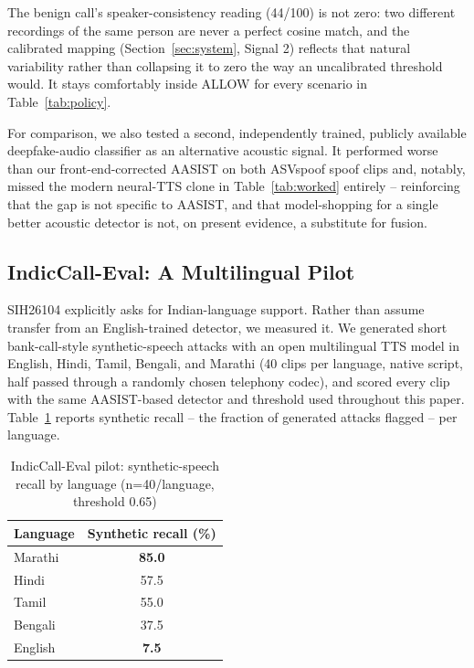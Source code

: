 \documentclass[conference]{IEEEtran}
\begin{document}
The benign call's speaker-consistency reading (44/100) is not zero: two
different recordings of the same person are never a perfect cosine match,
and the calibrated mapping (Section~\ref{sec:system}, Signal 2) reflects
that natural variability rather than collapsing it to zero the way an
uncalibrated threshold would. It stays comfortably inside ALLOW for every
scenario in Table~\ref{tab:policy}.

For comparison, we also tested a second, independently trained,
publicly available deepfake-audio classifier as an alternative acoustic
signal. It performed worse than our front-end-corrected AASIST on both
ASVspoof spoof clips and, notably, missed the modern neural-TTS clone in
Table~\ref{tab:worked} entirely -- reinforcing that the gap is not
specific to AASIST, and that model-shopping for a single better acoustic
detector is not, on present evidence, a substitute for fusion.

\subsection{IndicCall-Eval: A Multilingual Pilot}
\label{sec:indic}
SIH26104 explicitly asks for Indian-language support. Rather than assume
transfer from an English-trained detector, we measured it. We generated
short bank-call-style synthetic-speech attacks with an open multilingual
TTS model \cite{mms} in English, Hindi, Tamil, Bengali, and Marathi (40
clips per language, native script, half passed through a randomly
chosen telephony codec), and scored every clip with the same
AASIST-based detector and threshold used throughout this paper.
Table~\ref{tab:indic} reports synthetic recall -- the fraction of
generated attacks flagged -- per language.

\begin{table}[t]
\centering
\caption{IndicCall-Eval pilot: synthetic-speech recall by language (n=40/language, threshold 0.65)}
\label{tab:indic}
\begin{tabular}{@{}lc@{}}
\toprule
Language & Synthetic recall (\%) \\
\midrule
Marathi  & \textbf{85.0} \\
Hindi    & 57.5 \\
Tamil    & 55.0 \\
Bengali  & 37.5 \\
English  & \textbf{7.5} \\
\bottomrule
\end{tabular}
\end{table}
\end{document}
